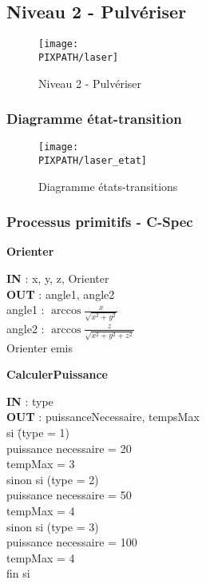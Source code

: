 \subsection{Niveau 2 - Pulvériser}

\begin{center}
\begin{figure}[!h]
\texttt{[image: \\PIXPATH/laser]}
\caption{Niveau 2 - Pulvériser}
\end{figure}
\end{center}


\subsubsection{Diagramme état-transition}

\begin{center}
\begin{figure}[!h]
\texttt{[image: \\PIXPATH/laser\_etat]}
\caption{Diagramme états-transitions}
\end{figure}
\end{center}

\vfill
\pagebreak

\subsubsection{Processus primitifs - C-Spec}

\begin{description}
	
	\item \textbf{Orienter}
		\begin{tabbing} 
		\textbf{IN} : x, y, z, Orienter \\
		\textbf{OUT} : angle1, angle2 \\
		angle1 : $\arccos{\frac{x}{\sqrt{x^2+y^2}}}$ \\
		angle2 : $\arccos{\frac{z}{\sqrt{x^2+y^2+z^2}}}$ \\
		Orienter emis
		\end{tabbing}

	\item \textbf{CalculerPuissance}
		\begin{tabbing} 
		\textbf{IN} : type \\
		\textbf{OUT} : puissanceNecessaire, tempsMax \\
		si \=(type = 1) \\
			\>puissance necessaire = 20 \\
			\>tempMax = 3 \\
		sinon si (type = 2) \\
			\>puissance necessaire = 50 \\
			\>tempMax = 4 \\
		sinon si (type = 3) \\
			\>puissance necessaire = 100 \\
			\>tempMax = 4 \\
		fin si
		\end{tabbing} 


\end{description}

\vfill
\pagebreak

